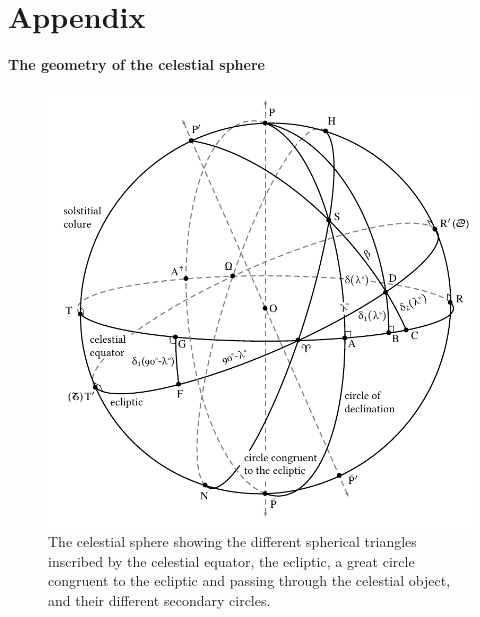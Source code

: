 \appendix
\renewcommand{\thesection}{\Alph{section}}
\OnehalfSpacing

\section*{Appendix}
\bigskip
\textbf{The geometry of the celestial sphere}
\bigskip

\begin{figure}[!htbp]
    \centering
    \includegraphics[width=\textwidth]{Images/Pstricks_drawing_declination_persian_sanskrit.pdf}
    \captionsetup{labelformat=empty}
    \caption{The celestial sphere showing the different spherical triangles inscribed by the celestial equator, the ecliptic, a great circle congruent to the ecliptic and passing through the celestial object, and their different secondary circles.}
    \label{celestial_sphere_drawing}
\end{figure}
\clearpage

